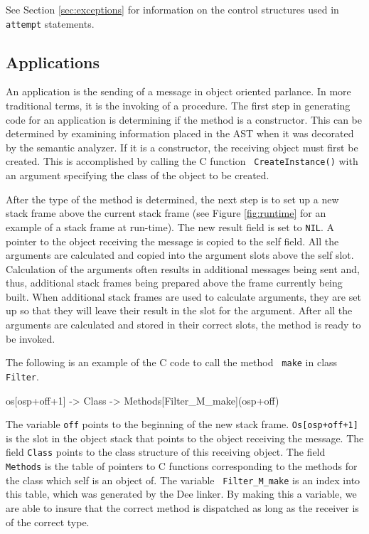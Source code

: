 See Section \ref{sec:exceptions} for information on the control
structures used in {\tt attempt} statements.

\subsection{Applications}
\label{sec:applications}

An application is the sending of a message in object oriented
parlance.  In more traditional terms, it is the invoking of a
procedure.  The first step in generating code for an application is
determining if the method is a constructor.  This can be determined by
examining information placed in the AST when it was decorated by the
semantic analyzer.  If it is a constructor, the receiving object must
first be created.  This is accomplished by calling the C function {\tt
CreateInstance()} with an argument specifying the class of the object
to be created.

After the type of the method is determined, the next step is to set up
a new stack frame above the current stack frame (see Figure
\ref{fig:runtime} for an example of a stack frame at run-time).  The new
result field is set to {\tt NIL}.  A pointer to the object receiving
the message is copied to the self field.  All the arguments are
calculated and copied into the argument slots above the self slot.
Calculation of the arguments often results in additional messages
being sent and, thus, additional stack frames being prepared above the
frame currently being built.  When additional stack frames are used to
calculate arguments, they are set up so that they will leave their
result in the slot for the argument.  After all the arguments are
calculated and stored in their correct slots, the method is ready to
be invoked.

The following is an example of the C code to call the method {\tt
make} in class {\tt Filter}.

\begin{prog}
\>  os[osp+off+1] -> Class -> Methods[Filter\_M\_make](osp+off)
\end{prog}

The variable {\tt off} points to the beginning of the new stack frame.
{\tt Os[osp+off+1]} is the slot in the object stack that points to the
object receiving the message.  The field {\tt Class} points to the
class structure of this receiving object.  The field {\tt Methods} is
the table of pointers to C functions corresponding to the methods for
the class which self is an object of.  The variable {\tt
Filter\_M\_make} is an index into this table, which was generated by
the Dee linker.  By making this a variable, we are able to insure that
the correct method is dispatched as long as the receiver is of the
correct type.

